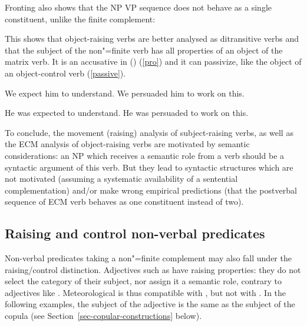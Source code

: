 \documentclass[output=paper
	        ,collection
	        ,collectionchapter
 	        ,biblatex
                ,babelshorthands
                ,newtxmath
                ,draftmode
                ,colorlinks, citecolor=brown
]{langscibook}
\begin{document}
Fronting also shows that the NP VP sequence does not behave as a single constituent, unlike the finite complement:

\eal
{}
\zl


This shows that object-raising verbs are better analysed as ditransitive verbs and that the subject of the non"=finite verb has all properties of an object of the matrix verb. It is an accusative in  () (\ref{pro}) and it can passivize, like the object of an object-control verb (\ref{passive}).

\begin{exe}
\ex
\begin{xlist} \label{pro}
\ex We expect him to understand.
\ex  We persuaded him to work on this.
\end{xlist}
\ex \begin{xlist} \label{passive}
\ex  He was expected to understand.
\ex  He was persuaded to work on this.
\end{xlist}
	
\end{exe}


To conclude, the movement (raising) analysis of subject-raising verbs, as well as the ECM analysis of object-raising verbs are motivated by semantic considerations: an NP which receives a semantic role from a verb should be a syntactic argument of this verb. But they lead to syntactic structures which are not motivated (assuming a systematic availability of a sentential complementation) and/or make wrong empirical predictions (that the postverbal sequence of ECM verb behaves as one constituent instead of two).
 
\subsection{Raising and control non-verbal predicates}\label{nonverbal}

Non-verbal predicates taking a non"=finite complement may also fall under the raising/control distinction.  Adjectives such as  have raising properties: they do not select the category of their subject, nor assign it a semantic role, contrary to adjectives like . Meteorological  is thus compatible with , but not with . In the following examples, the subject of the adjective is the same as the subject of the copula (see Section~\ref{sec-copular-constructions} below).
\end{document}
